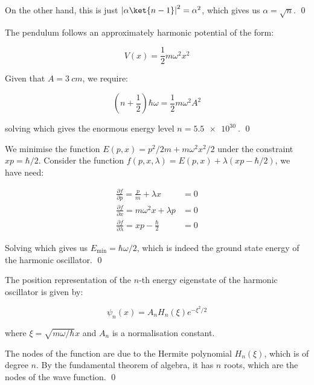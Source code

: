 \documentclass[12pt]{article}
\begin{document}
On the other hand, this is just $\left\lvert \alpha \ket{n - 1} \right\rvert^{2} = \alpha^{2}$, which gives us $\alpha = \sqrt{n}$.
\qed


The pendulum follows an approximately harmonic potential of the form:

\begin{equation}
    V(x) = \frac{1}{2} m \omega^{2} x^{2}
\end{equation}

Given that $A = \qty{3}{cm}$, we require:

\begin{equation}
    \left( n + \frac{1}{2} \right) \hbar \omega = \frac{1}{2} m \omega^{2} A^{2}
\end{equation}

solving which gives the enormous energy level $n = \qty{5.5e30}{}$.
\qed


We minimise the function $E(p, x) = p^{2}/2m + m\omega^{2} x^{2}/2$ under the constraint $xp = \hbar/2$. Consider the function $f(p, x, \lambda) = E(p, x) + \lambda (xp - \hbar/2)$, we have need:

\begin{equation}
\begin{split}
    \frac{\partial f}{\partial p} = \frac{p}{m} + \lambda x &= 0 \\
    \frac{\partial f}{\partial x} = m\omega^{2} x + \lambda p &= 0 \\
    \frac{\partial f}{\partial \lambda} = xp - \frac{\hbar}{2} &= 0
\end{split}
\end{equation}

Solving which gives us $E_{\text{min}} = \hbar \omega / 2$, which is indeed the ground state energy of the harmonic oscillator.
\qed


The position representation of the $n$-th energy eigenstate of the harmonic oscillator is given by:

\begin{equation}
    \psi_{n}(x) = A_{n} H_{n}(\xi) e^{-\xi^{2}/2}
\end{equation}

where $\xi = \sqrt{m\omega/\hbar} x$ and $A_{n}$ is a normalisation constant.

The nodes of the function are due to the Hermite polynomial $H_{n}(\xi)$, which is of degree $n$. By the fundamental theorem of algebra, it has $n$ roots, which are the nodes of the wave function.
\qed
\end{document}
